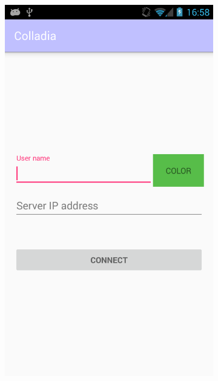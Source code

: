 \begin{itemize}
		\vspace*{\fill}
		\begin{figure}[!h]
			\centering
			\begin{subfigure}[t]{.3\textwidth}
				\includegraphics[width=\textwidth]{img/screen/new/colladia_connexion}
			\end{subfigure}
			~
			\begin{subfigure}[t]{.3\textwidth}

\end{subfigure}
\end{figure}
\end{itemize}
